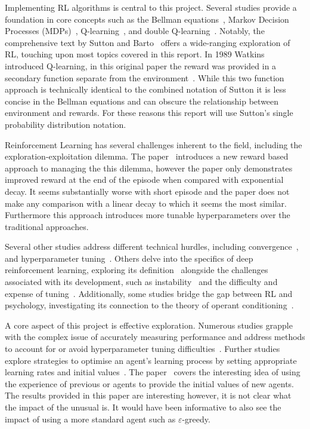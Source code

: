 \documentclass[]{final_report}
\begin{document}
Implementing RL algorithms is central to this project. Several studies provide a foundation in core concepts such as the Bellman equations~\cite{bellman1957}, Markov Decision Processes (MDPs)~\cite{meyn2012markov,sutton2018reinforcement}, Q-learning~\cite{watkins1992q}, and double Q-learning~\cite{doubleQLearning}. Notably, the comprehensive text  by Sutton and Barto~\cite{sutton2018reinforcement} offers a wide-ranging exploration of RL, touching upon most topics covered in this report. In 1989 Watkins introduced Q-learning, in this original paper the reward was provided in a secondary function separate from the environment~\cite{watkins1992q}. While this two function approach is technically identical to the combined notation of Sutton it is less concise in the Bellman equations and can obscure the relationship between environment and rewards. For these reasons this report will use Sutton's single probability distribution notation.

Reinforcement Learning has several challenges inherent to the field, including the exploration-exploitation dilemma. The  paper~\cite{rewardEpsilonDecay} introduces a new reward based approach to managing the this dilemma, however the paper only demonstrates improved reward at the end of the episode when compared with exponential decay. It seems substantially worse with short episode and the paper does not make any comparison with a linear decay to which it seems the most similar. Furthermore this approach introduces more tunable hyperparameters over the traditional approaches.

Several other studies address different technical hurdles, including convergence~\cite{watkins1992q, QlearningConvergance}, and hyperparameter tuning~\cite{deepRLChallanges, searchStrategies}. Others delve into the specifics of deep reinforcement learning, exploring its definition~\cite{deepRLOverview} alongside the challenges associated with its development, such as instability~\cite{deepOnVsOffPolicy,sutton2018reinforcement} and the difficulty and expense of tuning~\cite{deepRLChallanges, DeepRLCost}. Additionally, some studies bridge the gap between RL and psychology, investigating its connection to the theory of operant conditioning~\cite{shteingart2014reinforcement,staddon2003operant}.

A core aspect of this project is effective exploration. Numerous studies grapple with the complex issue of accurately measuring performance and address methods to account for or avoid hyperparameter tuning difficulties~\cite{assessingDeepRL, evaluatingRL, parameterFreeExploration}. Further studies explore strategies to optimise an agent's learning process by setting appropriate learning rates and initial values~\cite{even2003learning, deathTransfer,decayingLearningRates}. The  paper~\cite{deathTransfer} covers the interesting idea of using the experience of previous or  agents to provide the initial values of new agents. The results provided in this paper are interesting however, it is not clear what the impact of the unusual  is. It would have been informative to also see the impact of using a more standard agent such as $\varepsilon$-greedy.
\end{document}
